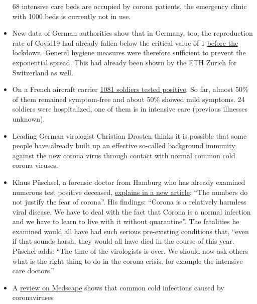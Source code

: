 \begin{itemize}
  68 intensive care beds are occupied by corona patients, the emergency
  clinic with 1000 beds is currently not in use.
\item
  New data of German authorities show that in Germany, too, the
  reproduction rate of Covid19 had already fallen below the critical
  value of 1
  \href{https://www.rki.de/DE/Content/Infekt/EpidBull/Archiv/2020/Ausgaben/17_20_SARS-CoV2_vorab.pdf?__blob=publicationFile\#page=5}{before
  the lockdown}. General hygiene measures were therefore sufficient to
  prevent the exponential spread. This had already been shown by the ETH
  Zurich for Switzerland as well.
\item
  On a French aircraft carrier
  \href{https://www.ouest-france.fr/sante/virus/coronavirus/coronavirus-au-moins-940-marins-positifs-sur-le-charles-de-gaulle-et-son-escorte-6810816}{1081
  soldiers tested positive}. So far, almost 50\% of them remained
  symptom-free and about 50\% showed mild symptoms. 24 soldiers were
  hospitalized, one of them is in intensive care (previous illnesses
  unknown).
\item
  Leading German virologist Christian Drosten thinks it is possible that
  some people have already built up an effective so-called
  \href{https://www.watson.de/!324026684}{background immunity} against
  the new corona virus through contact with normal common cold corona
  viruses.
\item
  Klaus Püschsel, a forensic doctor from Hamburg who has already
  examined numerous test positive deceased,
  \href{https://www.abendblatt.de/hamburg/article228908865/hamburg-corona-virus-uke-infektion-covid-19-pueschel-coronavirus-krise-patienten-impfstoff-immunitaet-krankenhaeuser-kontaktverbot-kliniken-infektionsrate-krankheit-pandemie-test-lungenkrankheit-sars-cov-epidemie-sars-cov-2.html}{explains
  in a new article}: ``The numbers do not justify the fear of corona''.
  His findings: ``Corona is a relatively harmless viral disease. We have
  to deal with the fact that Corona is a normal infection and we have to
  learn to live with it without quarantine''. The fatalities he examined
  would all have had such serious pre-existing conditions that, ``even
  if that sounds harsh, they would all have died in the course of this
  year. Püschel adds: ``The time of the virologists is over. We should
  now ask others what is the right thing to do in the corona crisis, for
  example the intensive care doctors.''
\item
  A \href{https://emedicine.medscape.com/article/227820-overview}{review
  on Medscape} shows that common cold infections caused by coronaviruses

\end{itemize}

